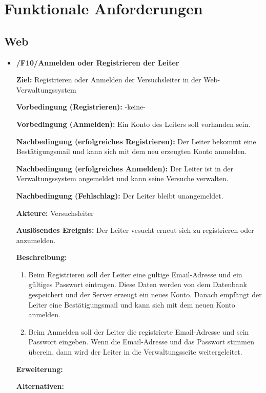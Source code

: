 \documentclass[a4paper]{scrreprt}
\begin{document}
    \chapter{Funktionale Anforderungen}

		\section{Web}
	        \begin{itemize}
	            \item \textbf{/F10/Anmelden oder Registrieren der Leiter}
		
	            	\par \textbf{Ziel: }Registrieren oder Anmelden der Versuchsleiter in der Web-Verwaltungssystem
	            	\par \textbf{Vorbedingung (Registrieren): }-keine-
	            	\par \textbf{Vorbedingung (Anmelden): }Ein Konto des Leiters soll vorhanden sein.
	            	\par \textbf{Nachbedingung (erfolgreiches Registrieren): }Der Leiter bekommt eine Bestätigungsmail und kann sich mit dem neu erzeugten Konto anmelden.
	            	\par \textbf{Nachbedingung (erfolgreiches Anmelden): }Der Leiter ist in der Verwaltungssystem angemeldet und kann seine Versuche verwalten.
	            	\par \textbf{Nachbedingung (Fehlschlag): }Der Leiter bleibt unangemeldet.
	            	\par \textbf{Akteure: }Versuchsleiter
	            	\par \textbf{Auslösendes Ereignis: }Der Leiter vesucht erneut sich zu registrieren oder anzumelden.
	            	\par \textbf{Beschreibung: }
		            	\begin{enumerate}
		            		\item Beim Registrieren soll der Leiter eine gültige Email-Adresse und ein gültiges Passwort eintragen. Diese Daten werden von dem Datenbank gespeichert und der Server erzeugt ein neues Konto. Danach empfängt der Leiter eine Bestätigungsmail und kann sich mit dem neuen Konto anmelden.
			            	\item Beim Anmelden soll der Leiter die registrierte Email-Adresse und sein Passwort eingeben. Wenn die Email-Adresse und das Passwort stimmen überein, dann wird der Leiter in die Verwaltungsseite weitergeleitet.
		            	\end{enumerate}
	            	\par \textbf{Erweiterung: }
	            	\par \textbf{Alternativen: }
	            	

\end{itemize}
\end{document}
